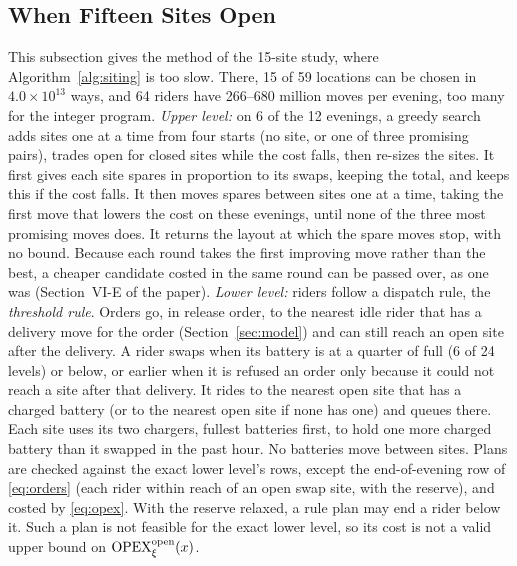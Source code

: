 \subsection{When Fifteen Sites Open}\label{sec:method:fifteen}
This subsection gives the method of the 15-site study, where Algorithm~\ref{alg:siting} is too slow. There, 15 of 59 locations can be chosen in $4.0\times10^{13}$ ways, and 64 riders have 266--680 million moves per evening, too many for the integer program. \emph{Upper level:} on 6 of the 12 evenings, a greedy search adds sites one at a time from four starts (no site, or one of three promising pairs), trades open for closed sites while the cost falls, then re-sizes the sites. It first gives each site spares in proportion to its swaps, keeping the total, and keeps this if the cost falls. It then moves spares between sites one at a time, taking the first move that lowers the cost on these evenings, until none of the three most promising moves does. It returns the layout at which the spare moves stop, with no bound. Because each round takes the first improving move rather than the best, a cheaper candidate costed in the same round can be passed over, as one was (Section~VI-E of the paper). \emph{Lower level:} riders follow a dispatch rule, the \emph{threshold rule}. Orders go, in release order, to the nearest idle rider that has a delivery move for the order (Section~\ref{sec:model}) and can still reach an open site after the delivery. A rider swaps when its battery is at a quarter of full (6 of 24 levels) or below, or earlier when it is refused an order only because it could not reach a site after that delivery. It rides to the nearest open site that has a charged battery (or to the nearest open site if none has one) and queues there. Each site uses its two chargers, fullest batteries first, to hold one more charged battery than it swapped in the past hour. No batteries move between sites. Plans are checked against the exact lower level's rows, except the end-of-evening row of \eqref{eq:orders} (each rider within reach of an open swap site, with the reserve), and costed by \eqref{eq:opex}. With the reserve relaxed, a rule plan may end a rider below it. Such a plan is not feasible for the exact lower level, so its cost is not a valid upper bound on $\mathrm{OPEX}^{\mathrm{open}}_\xi(x)$.

